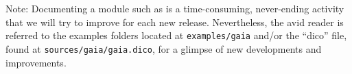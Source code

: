 \begin{WarningBlock}{Note:}
  Documenting a module such as \gaia{} is a time-consuming, never-ending activity that we will try to improve for each new release. Nevertheless,
  the avid reader is referred to the examples folders located at \texttt{examples/gaia} and/or the ``dico'' file, found at \texttt{sources/gaia/gaia.dico}, for a glimpse of new developments and improvements.
\end{WarningBlock}
